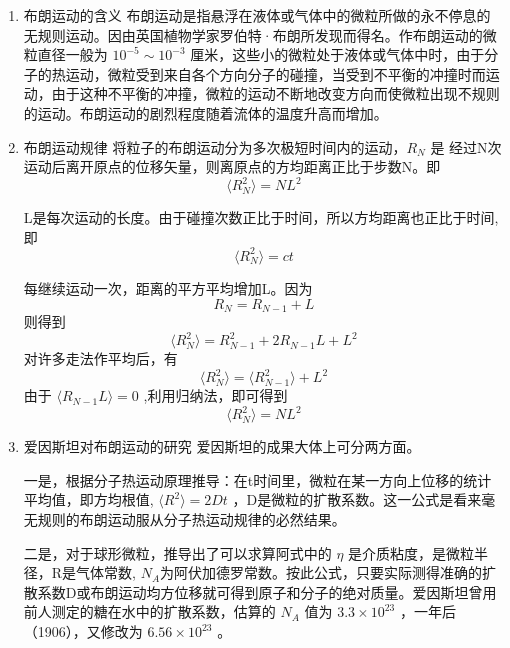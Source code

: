 \documentclass[12pt,a4paper,UTF8]{ctexart}
\begin{document}
\begin{enumerate}
    \item 布朗运动的含义
布朗运动是指悬浮在液体或气体中的微粒所做的永不停息的无规则运动。因由英国植物学家罗伯特·布朗所发现而得名。作布朗运动的微粒直径一般为 $10^{-5} \sim 10^{-3}$ 厘米，这些小的微粒处于液体或气体中时，由于分子的热运动，微粒受到来自各个方向分子的碰撞，当受到不平衡的冲撞时而运动，由于这种不平衡的冲撞，微粒的运动不断地改变方向而使微粒出现不规则的运动。布朗运动的剧烈程度随着流体的温度升高而增加。
    \item 布朗运动规律
将粒子的布朗运动分为多次极短时间内的运动，$R_N$ 是
经过N次运动后离开原点的位移矢量，则离原点的方均距离正比于步数N。即
\begin{equation}
		\langle R_N^2\rangle =NL^2
	\end{equation}

L是每次运动的长度。由于碰撞次数正比于时间，所以方均距离也正比于时间,即
\begin{equation}
		\langle R_N^2\rangle =ct
	\end{equation}

每继续运动一次，距离的平方平均增加L。因为
\begin{equation}
		R_N=R_{N-1}+L
	\end{equation}
则得到
\begin{equation}
		\langle R_N^2\rangle =R_{N-1}^2+2R_{N-1}L+L^2
	\end{equation}
对许多走法作平均后，有
\begin{equation}
		\langle R_N^2\rangle =\langle R_{N-1}^2\rangle +L^2
	\end{equation}
由于 $\langle R_{N-1}L\rangle=0$ ,利用归纳法，即可得到
\begin{equation}
		\langle R_N^2\rangle =NL^2
	\end{equation}

	\item 爱因斯坦对布朗运动的研究
爱因斯坦的成果大体上可分两方面。

一是，根据分子热运动原理推导：在t时间里，微粒在某一方向上位移的统计平均值，即方均根值, $\langle R^2 \rangle=2Dt$ ，D是微粒的扩散系数。这一公式是看来毫无规则的布朗运动服从分子热运动规律的必然结果。

二是，对于球形微粒，推导出了可以求算阿式中的 $\eta$ 是介质粘度，是微粒半径，R是气体常数, $N_A$为阿伏加德罗常数。按此公式，只要实际测得准确的扩散系数D或布朗运动均方位移就可得到原子和分子的绝对质量。爱因斯坦曾用前人测定的糖在水中的扩散系数，估算的 $N_A$ 值为 $3.3 \times 10^{23}$ ，一年后（1906），又修改为 $6.56 \times 10^{23}$ 。


\end{enumerate}
\end{document}
